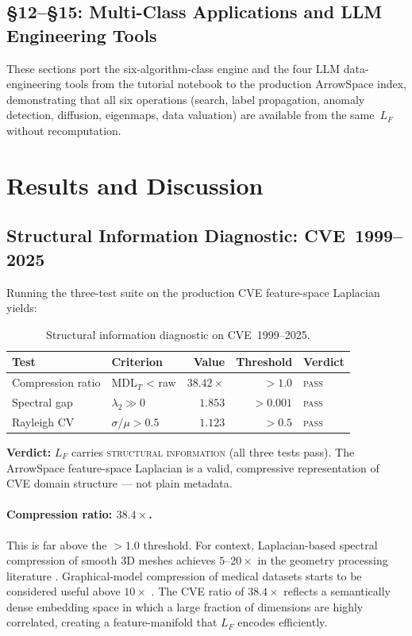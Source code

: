 \documentclass[12pt,a4paper]{article}
\theoremstyle{plain}
\theoremstyle{definition}
\theoremstyle{remark}
\newcommand{\1}{\mathbf{1}}
\begin{document}
	\subsection{§12--§15: Multi-Class Applications and LLM Engineering Tools}
	
	These sections port the six-algorithm-class engine and the four LLM
	data-engineering tools from the tutorial notebook to the production
	ArrowSpace index, demonstrating that all six operations
	(search, label propagation, anomaly detection, diffusion, eigenmaps,
	data valuation) are available from the same~$L_F$ without recomputation.
	
	\section{Results and Discussion}
	\label{sec:results}
	
	\subsection{Structural Information Diagnostic: CVE~1999--2025}
	
	Running the three-test suite on the production CVE feature-space
	Laplacian yields:
	
	\begin{table}[H]
		\centering
		\caption{Structural information diagnostic on CVE~1999--2025.}
		\label{tab:cve-diag}
		\begin{tabular}{llrrl}
			\toprule
			Test & Criterion & Value & Threshold & Verdict \\
			\midrule
			Compression ratio  & MDL$_T$ < raw       & $38.42\times$ & $> 1.0$  & \textsc{pass} \\
			Spectral gap       & $\lambda_2 \gg 0$   & $1.853$        & $> 0.001$& \textsc{pass} \\
			Rayleigh CV        & $\sigma/\mu > 0.5$  & $1.123$        & $> 0.5$  & \textsc{pass} \\
			\bottomrule
		\end{tabular}
	\end{table}
	
	\noindent\textbf{Verdict:} $L_F$ carries \textsc{structural information}
	(all three tests pass).
	The ArrowSpace feature-space Laplacian is a valid, compressive
	representation of CVE domain structure --- not plain metadata.
	
	\paragraph{Compression ratio: $38.4\times$.}
	This is far above the $> 1.0$ threshold.
	For context, Laplacian-based spectral compression of smooth 3D meshes
	achieves $5$--$20\times$ in the geometry processing literature
	\citep{ShumanDSPGraphs}.
	Graphical-model compression of medical datasets starts to be considered
	useful above $10\times$ \citep{DongLaplacianGMRF}.
	The CVE ratio of $38.4\times$ reflects a semantically dense embedding
	space in which a large fraction of dimensions are highly correlated,
	creating a feature-manifold that $L_F$ encodes efficiently.
	
\end{document}

